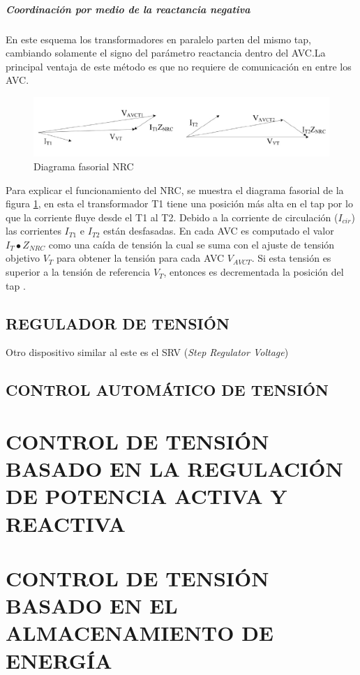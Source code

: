 \documentclass[12pt, letterpaper]{report}
\begin{document}
\paragraph{Coordinación por medio de la reactancia negativa}
En este esquema los transformadores en paralelo parten del mismo tap, cambiando solamente el signo del parámetro reactancia dentro del AVC.La principal ventaja de este método es que no requiere de comunicación en entre los AVC.
\begin{figure}[h]
\centering
\includegraphics[width=0.7\linewidth]{imagenes/cap_2/diagrama_fasorial_nrc}
\caption{Diagrama fasorial NRC}
\label{fig:diagrama_fasorial_nrc}
\end{figure}
Para explicar el funcionamiento del NRC, se muestra el diagrama fasorial de la figura \ref{fig:diagrama_fasorial_nrc}, en esta el transformador T1 tiene una posición más alta en el tap por lo que la corriente fluye desde el T1 al T2\cite{Sarimuthu2016}. Debido a la corriente de circulación ($I_{cir}$) las corrientes $I_{T1}$ e $I_{T2}$  están desfasadas. En cada AVC es computado el valor $I_{T} \bullet Z_{NRC}$ como una caída de tensión la cual se suma con el ajuste de tensión objetivo $V_{T}$ para obtener la tensión para cada AVC $V_{AVCT}$. Si esta tensión es superior a la tensión de referencia $V_{T}$, entonces es decrementada  la posición del tap \cite{Sarimuthu2016}.

\section{REGULADOR DE TENSIÓN}
Otro dispositivo similar al este es el SRV (\textit{Step Regulator Voltage})

\section{CONTROL AUTOMÁTICO DE TENSIÓN}


\chapter{CONTROL DE TENSIÓN BASADO EN LA REGULACIÓN DE POTENCIA ACTIVA Y REACTIVA}
\label{cap_reactiva}

\cite{Oshiro2011}
\chapter{CONTROL DE TENSIÓN BASADO EN EL ALMACENAMIENTO DE ENERGÍA}
\label{cap_almacenamiento}
\end{document}
